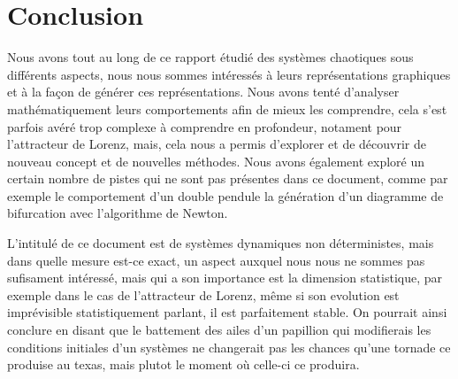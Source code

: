 \chapter{Conclusion}

Nous avons tout au long de ce rapport étudié des systèmes chaotiques sous différents aspects, nous nous sommes intéressés à leurs représentations graphiques et à la façon de générer ces représentations. Nous avons tenté d'analyser mathématiquement leurs comportements afin de mieux les comprendre, cela s'est parfois avéré trop complexe à comprendre en profondeur, notament pour l'attracteur de Lorenz, mais, cela nous a permis d'explorer et de découvrir de nouveau concept et de nouvelles méthodes. Nous avons également exploré un certain nombre de pistes qui ne sont pas présentes dans ce document, comme par exemple le comportement d'un double pendule la génération d'un diagramme de bifurcation avec l'algorithme de Newton.

L'intitulé de ce document est  de systèmes dynamiques non déterministes\fg{}, mais dans quelle mesure est-ce exact, un aspect auxquel nous nous ne sommes pas sufisament intéressé, mais qui a son importance est la dimension statistique, par exemple dans le cas de l'attracteur de Lorenz, même si son evolution est imprévisible statistiquement parlant, il est parfaitement stable. On pourrait ainsi conclure en disant que le battement des ailes d'un papillion qui modifierais les conditions initiales d'un systèmes ne changerait pas les chances qu'une tornade ce produise au texas, mais plutot le moment où celle-ci ce produira. 